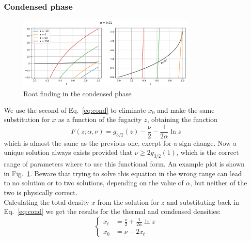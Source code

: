 \documentclass{article}
\begin{document}
\subsubsection*{Condensed phase}
\begin{figure}
  \centering
  \includegraphics[width=0.8\textwidth]{figures/fig_solve_cond}
  \caption{Root finding in the condensed phase}
  \label{fig:solve_cond}
\end{figure}
We use the second of Eq.~\ref{eq:cond} to eliminate $x_0$ and make the same substitution for $x$ as a function of the fugacity $z$, obtaining the function
\begin{equation}
  F(z; \alpha, \nu) = g_{3/2}(z) - \frac{\nu}{2} - \frac{1}{2\alpha}\ln z
\end{equation}
which is almost the same as the previous one, except for a sign change. Now a unique solution always exists provided that $\nu \geq 2 g_{3/2}(1)$, which is the correct range of parameters where to use this functional form. An example plot is shown in Fig.~\ref{fig:solve_cond}. Beware that trying to solve this equation in the wrong range can lead to no solution or to two solutions, depending on the value of $\alpha$, but neither of the two is physically correct.\\
Calculating the total density $x$ from the solution for $z$ and substituting back in Eq.~\ref{eq:cond} we get the results for the thermal and condensed densities:
\begin{equation}
  \left\{
  \begin{aligned}
    x_t &= \frac{\nu}{2} + \frac{1}{2\alpha}\ln z \\
    x_0 &= \nu - 2 x_t
  \end{aligned}
  \right.
\end{equation}
\end{document}
